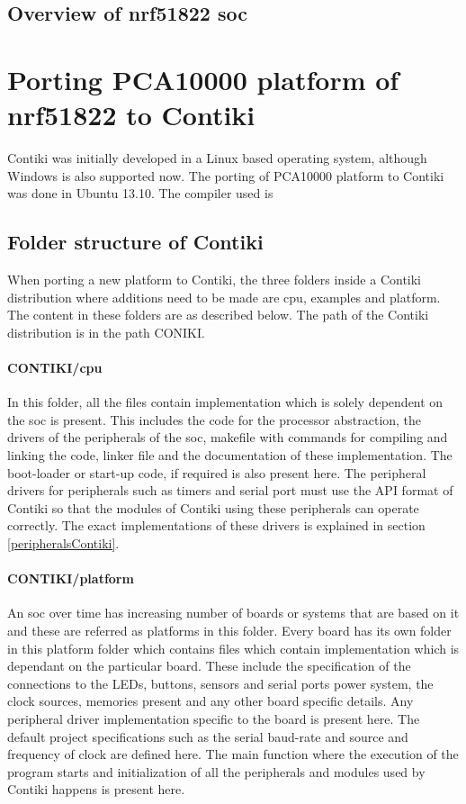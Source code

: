 \subsection{Overview of nrf51822 \gls{soc}}

\section{Porting PCA10000 platform of nrf51822 to Contiki}
Contiki was initially developed in a Linux based operating system, although Windows is also supported now. The porting of PCA10000 platform to Contiki was done in Ubuntu 13.10. The compiler used is 

\subsection{Folder structure of Contiki}
When porting a new platform to Contiki, the three folders inside a Contiki distribution where additions need to be made are cpu, examples and platform. The content in these folders are as described below. The path of the Contiki distribution is in the path CONIKI.

\paragraph{CONTIKI/cpu}In this folder, all the files contain implementation which is solely dependent on the \gls{soc} is present. This includes the code for the processor abstraction, the drivers of the peripherals of the \gls{soc}, makefile with commands for compiling and linking the code, linker file and the documentation of these implementation. The boot-loader  or start-up code, if required is also present here. The peripheral drivers for peripherals such as timers and serial port must use the API format of Contiki so that the modules of Contiki using these peripherals can operate correctly. The exact implementations of these drivers is explained in section \ref{peripheralsContiki}. 

\paragraph{CONTIKI/platform} An \gls{soc} over time has increasing number of boards or systems that are based on it and these are referred as platforms in this folder. Every board has its own folder in this platform folder which contains files which contain implementation which is dependant on the particular board. These include the specification of the connections to the LEDs, buttons, sensors and serial ports power system, the clock sources, memories present and any other board specific details. Any peripheral driver implementation specific to the board is present here. The default project specifications such as the serial baud-rate and source and frequency of clock are defined here. The main function where the execution of the program starts and initialization of all the peripherals and modules used by Contiki happens is present here.

